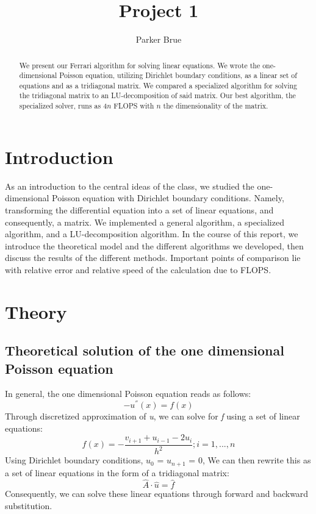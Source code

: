 \documentclass[10pt,showpacs,preprintnumbers,footinbib,amsmath,amssymb,aps,prl,twocolumn,groupedaddress,superscriptaddress,showkeys]{revtex4-1}
\begin{document}
\title{Project 1}
\author{Parker Brue}
\begin{abstract}
We present our Ferrari algorithm for solving linear equations. We wrote the one-dimensional Poisson equation, utilizing Dirichlet boundary conditions, as a linear set of equations and as a tridiagonal matrix. We compared a specialized algorithm for solving the tridiagonal matrix to an LU-decomposition of said matrix.  Our best algorithm, the specialized solver, runs as $4n$ FLOPS with $n$ the dimensionality of the matrix.
\end{abstract}
\maketitle

\section{Introduction}
As an introduction to the central ideas of the class, we studied the one-dimensional Poisson equation with Dirichlet boundary conditions. Namely, transforming the differential equation into a set of linear equations, and consequently, a matrix. We implemented a general algorithm, a specialized algorithm, and a LU-decomposition algorithm. In the course of this report, we introduce the theoretical model and the different algorithms  we developed, then discuss the results of the different methods. Important points of comparison lie with relative error and relative speed of the calculation due to FLOPS. 

\section{Theory}
	\subsection{Theoretical solution of the one dimensional Poisson equation}	
In general, the one dimensional Poisson equation reads as follows: \begin{equation} -u^{''}(x) = f(x)     \end{equation}  Through discretized approximation of {\it u}, we can solve for {\it f} using a set of linear equations: \begin{equation}
	f(x)=-\frac{v_{i+1}+u_{i-1}-2u_{i}}{h^{2}}      ;      i=1,...,n
	\end{equation}
Using Dirichlet boundary conditions, $u_{0}$  = $u_{n+1}$ = 0,  We can then rewrite this as a set of linear equations in the form of a tridiagonal matrix: \begin{equation}	
	\hat{A} \cdot \hat{u} = \hat{f}
	\end{equation}
Consequently, we can solve these linear equations through forward and backward substitution.
\end{document}
